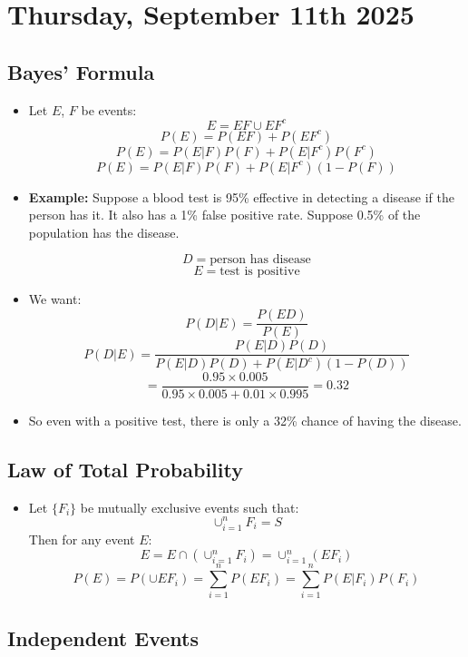\section{Thursday, September 11th 2025}

\subsection{Bayes' Formula}

\begin{itemize}
      \item Let $E$, $F$ be events:
            \[ E = EF \cup EF^c \]
            \[ P(E) = P(EF) + P(EF^c) \]
            \[ P(E) = P(E|F)P(F) + P(E|F^c)P(F^c) \]
            \[ P(E) = P(E|F)P(F) + P(E|F^c)(1 - P(F)) \]

      \item \textbf{Example:} Suppose a blood test is 95\% effective in detecting a disease if the person has it. It also has a 1\% false positive rate. Suppose 0.5\% of the population has the disease.

            \[ D = \text{person has disease} \]
            \[ E = \text{test is positive} \]

      \item We want:
            \[ P(D|E) = \frac{P(ED)}{P(E)} \]
            \[ P(D|E) = \frac{P(E|D)P(D)}{P(E|D)P(D) + P(E|D^c)(1 - P(D))} \]
            \[ = \frac{0.95 \times 0.005}{0.95 \times 0.005 + 0.01 \times 0.995} = 0.32 \]

      \item So even with a positive test, there is only a 32\% chance of having the disease.
\end{itemize}

\subsection{Law of Total Probability}

\begin{itemize}
      \item Let $\{F_i\}$ be mutually exclusive events such that:
            \[ \cup_{i=1}^n F_i = S \]
            Then for any event $E$:
            \[ E = E \cap \left( \cup_{i=1}^n F_i \right) = \cup_{i=1}^n (E F_i) \]
            \[ P(E) = P\left( \cup E F_i \right) = \sum_{i=1}^n P(E F_i) = \sum_{i=1}^n P(E|F_i)P(F_i) \]
\end{itemize}

\subsection{Independent Events}

